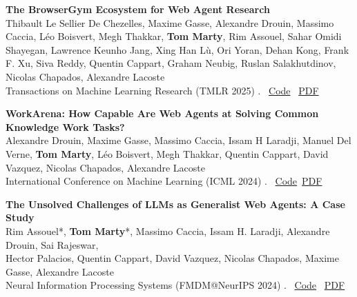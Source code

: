 \documentclass[letterpaper,11pt]{article}
\begin{document}
\begin{tcolorbox}[enhanced, rounded corners, colback=white, colframe=black!10!white, boxrule=0.5mm, left=10pt, right=10pt, top=6pt, bottom=3pt]
    \textbf{The BrowserGym Ecosystem for Web Agent Research} \\
    Thibault Le Sellier De Chezelles, Maxime Gasse, Alexandre Drouin, Massimo Caccia, Léo Boisvert, Megh Thakkar, \textbf{Tom Marty}, Rim Assouel, Sahar Omidi Shayegan, Lawrence Keunho Jang, Xing Han Lù, Ori Yoran, Dehan Kong, Frank F. Xu, Siva Reddy, Quentin Cappart, Graham Neubig, Ruslan Salakhutdinov, Nicolas Chapados, Alexandre Lacoste \\
        Transactions on Machine Learning Research (TMLR 2025) . \hfill  \faCode  \, \href{https://github.com/ServiceNow/BrowserGym}{Code} \quad
    \faFilePdf \, \href{https://arxiv.org/abs/2412.05467}{PDF}
\end{tcolorbox}

\begin{tcolorbox}[enhanced, rounded corners, colback=white, colframe=black!10!white, boxrule=0.5mm, left=10pt, right=10pt, top=6pt, bottom=3pt]
    \textbf{WorkArena: How Capable Are Web Agents at Solving Common Knowledge Work Tasks?} \\
    Alexandre Drouin, Maxime Gasse, Massimo Caccia, Issam H Laradji, Manuel Del Verne, \textbf{Tom Marty}, Léo Boisvert, Megh Thakkar, Quentin Cappart, David Vazquez, Nicolas Chapados, Alexandre Lacoste \\
    International Conference on Machine Learning (ICML 2024) .  \hfill
\faCode\, \href{https://github.com/ServiceNow/WorkArena}{Code}\quad \faFilePdf \, \href{https://servicenow.github.io/WorkArena/}{PDF}
\end{tcolorbox}

\begin{tcolorbox}[enhanced, rounded corners, colback=white, colframe=black!10!white, boxrule=0.5mm, left=10pt, right=10pt, top=6pt, bottom=3pt]
    \textbf{The Unsolved Challenges of LLMs as Generalist Web Agents: A Case Study} \\
    Rim Assouel*, \textbf{Tom Marty}*, Massimo Caccia, Issam H. Laradji, Alexandre Drouin, Sai Rajeswar,\\ Hector Palacios, Quentin Cappart, David Vazquez, Nicolas Chapados, Maxime Gasse, Alexandre Lacoste \\
    Neural Information Processing Systems (FMDM@NeurIPS 2024) . \hfill \quad \faCode\, \href{https://github.com/ServiceNow/WorkArena}{Code} \quad \faFilePdf \, \href{https://openreview.net/forum?id=jt3il4fC5B}{PDF}
\end{tcolorbox}
\end{document}
